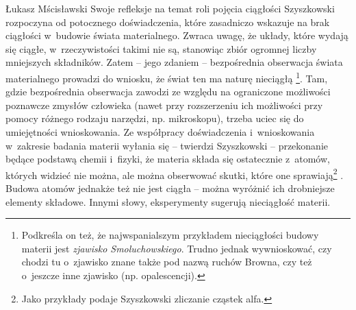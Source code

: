 \begin{artplenv}{Łukasz Mścisławski}
Swoje refleksje na temat roli pojęcia ciągłości Szyszkowski rozpoczyna od potocznego doświadczenia, które zasadniczo wskazuje na brak ciągłości w~budowie świata materialnego. Zwraca uwagę, że układy, które wydają się ciągłe, w~rzeczywistości takimi nie są, stanowiąc zbiór ogromnej liczby mniejszych składników. Zatem -- jego zdaniem -- bezpośrednia obserwacja świata materialnego prowadzi do wniosku, że świat ten ma naturę nieciągłą
\parencite[por.][s.~45–46]{szyszkowski_o_1916}%
\footnote{Podkreśla on też, że najwspanialszym przykładem nieciągłości budowy materii jest \textit{zjawisko Smoluchowskiego}. Trudno jednak wywnioskować, czy chodzi tu o~zjawisko znane także pod nazwą ruchów Browna, czy też o~jeszcze inne zjawisko (np. opalescencji).}. Tam, gdzie bezpośrednia obserwacja zawodzi ze względu na ograniczone możliwości poznawcze zmysłów człowieka (nawet przy rozszerzeniu ich możliwości przy pomocy różnego rodzaju narzędzi, np. mikroskopu), trzeba uciec się do umiejętności wnioskowania. Ze współpracy doświadczenia i~wnioskowania w~zakresie badania materii wyłania się -- twierdzi Szyszkowski -- przekonanie będące podstawą chemii i~fizyki, że materia składa się ostatecznie z~atomów, których widzieć nie można, ale można obserwować skutki, które one sprawiają\footnote{Jako przykłady podaje Szyszkowski zliczanie cząstek alfa.} . Budowa atomów jednakże też nie jest ciągła -- można wyróżnić ich drobniejsze elementy składowe. Innymi słowy, eksperymenty sugerują nieciągłość materii.


\end{artplenv}
